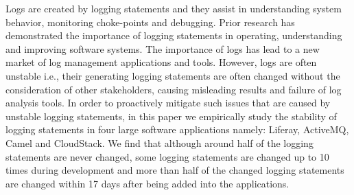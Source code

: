 
Logs are created by logging statements and they	 assist in understanding system behavior, monitoring choke-points and debugging. Prior research has demonstrated the importance of  logging statements in operating, understanding and improving software systems. The importance of logs has lead to a new market of log management applications and tools. However, logs are often unstable i.e., their generating logging statements are often changed without the consideration of other stakeholders, causing misleading results and failure of log analysis tools. In order to proactively mitigate such issues that are caused by unstable logging statements, in this paper we empirically study the stability of logging statements in four large software applications namely: Liferay, ActiveMQ, Camel and CloudStack. We find that although around half of the logging statements are never changed, some logging statements are changed up to 10 times during development and more than half of the changed logging statements are changed within 17 days after being added into the applications. 

